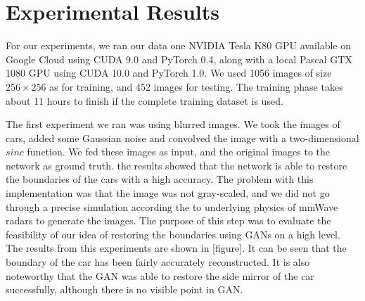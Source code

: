 \section{ Experimental Results} \label{experiment}
For our experiments, we ran our data one NVIDIA Tesla K80 GPU available on Google Cloud using CUDA 9.0 and PyTorch 0.4, along with a local Pascal GTX 1080 GPU using CUDA 10.0 and PyTorch 1.0. We used 1056 images of size $256 \times 256$ as for training, and 452 images for testing. The training phase takes about 11 hours to finish if the complete training dataset is used.

The first experiment we ran was using blurred images. We took the images of cars, added some Gaussian noise and convolved the image with a two-dimensional $sinc$ function. We fed these images as input, and the original images to the network as ground truth. the results showed that the network is able to restore the boundaries of the cars with a high accuracy. The problem with this implementation was that the image was not gray-scaled, and we did not go through a precise simulation according the to underlying physics of mmWave radars to generate the images. The purpose of this step was to evaluate the feasibility of our idea of restoring the boundaries using GANs on a high level. The results from this experiments are shown in [figure]. It can be seen that the boundary of the car has been fairly accurately reconstructed. It is also noteworthy that the GAN was able to restore the side mirror of the car successfully, although there is no visible point in GAN. 

